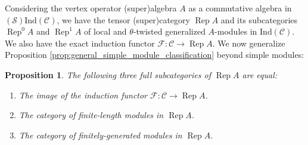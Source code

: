 \documentclass[11pt, reqno]{amsart}
\newtheorem{prop}[thm]{Proposition}
\theoremstyle{definition}\newtheorem{defi}[thm]{Definition}
\theoremstyle{definition}\newtheorem{rem}[thm]{Remark}
\theoremstyle{definition}\newtheorem{exam}[thm]{Example}
\theoremstyle{definition}\newtheorem{assum}[thm]{Assumption}
\newcommand{\cS}{\mathcal{S}}
\newcommand{\cF}{\mathcal{F}}
\newcommand{\cC}{\mathcal{C}}
\newcommand{\ind}{\mathrm{Ind}}
\DeclareMathOperator{\rep}{Rep}
\newcommand{\repA}{\rep A}
\begin{document}
Considering the vertex operator (super)algebra $A$ as a commutative algebra in $(\cS)\ind(\cC)$, we have the tensor (super)category $\repA$ and its subcategories $\rep^0A$ and $\rep^1A$ of local and $\theta$-twisted generalized $A$-modules in $\ind(\cC)$. We also have the exact induction functor $\cF: \cC\rightarrow\repA$. We now generalize Proposition \ref{prop:general_simple_module_classification} beyond simple modules:
 \begin{prop}\label{prop:fin_gen_Rep_B_p}
The following three full subcategories of $\repA$ are equal:
\begin{enumerate}
\item The image of the induction functor $\cF:\cC\rightarrow\repA$.
\item The category of finite-length modules in $\repA$.
\item The category of finitely-generated modules in $\repA$.
\end{enumerate} 
\end{prop}
\end{document}
